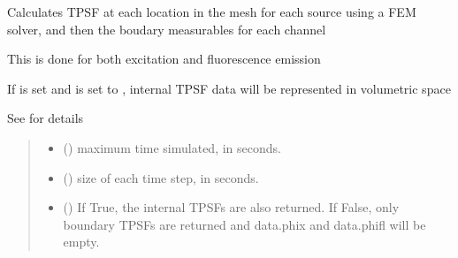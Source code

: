 \documentclass[letterpaper,10pt,english]{sphinxmanual}
\begin{document}
\begin{fulllineitems}
\begin{fulllineitems}
\label{\detokenize{_autosummary/nirfasterff.base.fluor_mesh.fluormesh:nirfasterff.base.fluor_mesh.fluormesh.femdata_tpsf}}
\pysigstartsignatures
{}
\pysigstopsignatures
\sphinxAtStartPar
Calculates TPSF at each location in the mesh for each source using a FEM solver, and then the boudary measurables for each channel

\sphinxAtStartPar
This is done for both excitation and fluorescence emission

\sphinxAtStartPar
If  is set and  is set to , internal TPSF data will be represented in volumetric space

\sphinxAtStartPar
See {\hyperref[\detokenize{_autosummary/nirfasterff.forward.femdata.femdata_fl_TR:nirfasterff.forward.femdata.femdata_fl_TR}]{}} for details
\begin{quote}\begin{description}
\begin{itemize}
\item {} 
\sphinxAtStartPar
{} () \textendash{} maximum time simulated, in seconds.

\item {} 
\sphinxAtStartPar
{} () \textendash{} size of each time step, in seconds.

\item {} 
\sphinxAtStartPar
{} (\sphinxstyleliteralemphasis{\sphinxupquote{, }}) \textendash{} 
\sphinxAtStartPar
If True, the internal TPSFs are also returned. If False, only boundary TPSFs are returned and data.phix and data.phifl will be empty.


\end{itemize}
\end{description}
\end{quote}
\end{fulllineitems}
\end{fulllineitems}
\end{document}
